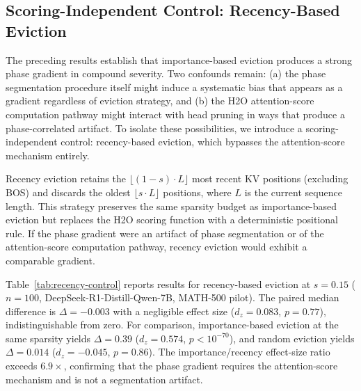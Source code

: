 \subsection{Scoring-Independent Control: Recency-Based Eviction}
\label{sec:recency-control}

The preceding results establish that importance-based eviction produces a strong phase gradient in compound severity. Two confounds remain: (a) the phase segmentation procedure itself might induce a systematic bias that appears as a gradient regardless of eviction strategy, and (b) the H2O attention-score computation pathway might interact with head pruning in ways that produce a phase-correlated artifact. To isolate these possibilities, we introduce a scoring-independent control: recency-based eviction, which bypasses the attention-score mechanism entirely.

Recency eviction retains the $\lfloor (1-s) \cdot L \rfloor$ most recent KV positions (excluding BOS) and discards the oldest $\lfloor s \cdot L \rfloor$ positions, where $L$ is the current sequence length. This strategy preserves the same sparsity budget as importance-based eviction but replaces the H2O scoring function with a deterministic positional rule. If the phase gradient were an artifact of phase segmentation or of the attention-score computation pathway, recency eviction would exhibit a comparable gradient.

Table~\ref{tab:recency-control} reports results for recency-based eviction at $s{=}0.15$ ($n{=}100$, DeepSeek-R1-Distill-Qwen-7B, MATH-500 pilot). The paired median difference is $\Delta{=}-0.003$ with a negligible effect size ($d_z{=}0.083$, $p{=}0.77$), indistinguishable from zero. For comparison, importance-based eviction at the same sparsity yields $\Delta{=}0.39$ ($d_z{=}0.574$, $p < 10^{-70}$), and random eviction yields $\Delta{=}0.014$ ($d_z{=}-0.045$, $p{=}0.86$). The importance/recency effect-size ratio exceeds $6.9{\times}$, confirming that the phase gradient requires the attention-score mechanism and is not a segmentation artifact.

